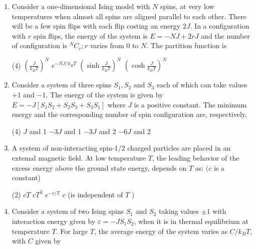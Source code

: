 \begin{enumerate}
\item Consider a one-dimensional Ising model with $N$ spins, at very low temperatures when almost all spins are aligned parallel to each other. There will be a few spin flips with each flip costing an energy $2 J .$ In a configuration with $r$ spin flips, the energy of the system is $E=-N J+2 r J$ and the number of configuration is ${ }^{N} C_{r} ; r$ varies from 0 to $N$. The partition function is
{}

\begin{tasks}(4)
\task[\textbf{A.}] $\left(\frac{J}{k_{B} T}\right)^{N}$
\task[\textbf{B.}]  $e^{-N J / k_{B} T}$
\task[\textbf{C.}] $\left(\sinh \frac{J}{k_{B} T}\right)^{N}$
\task[\textbf{D.}] $\left(\cosh \frac{J}{k_{B} T}\right)^{N}$
\end{tasks}


\item Consider a system of three spins $S_{1}, S_{2}$ and $S_{3}$ each of which can take values $+1$ and $-1 .$ The energy of the system is given by $E=-J\left[S_{1} S_{2}+S_{2} S_{3}+S_{3} S_{1}\right]$ where $J$ is a positive constant. The minimum energy and the corresponding number of spin configuration are, respectively,
{}

\begin{tasks}(4)
\task[\textbf{A.}] $J$ and 1
\task[\textbf{B.}] $-3 J$ and 1
\task[\textbf{C.}] $-3 J$ and 2
\task[\textbf{D.}] $-6 J$ and 2
\end{tasks}
\newcommand*{\downuparrow}[1]{\ensuremath{\overset{\uparrow}{#1}}}
\newcommand*{\downdownarrow}[1]{\ensuremath{\overset{\downarrow}{#1}}}


	\item A system of non-interacting spin-1/2 charged particles are placed in an extemal magnetic field. At low temperature $T$, the leading behavior of the excess energy above the ground state energy, depends on $T$ as: $(c$ is a constant)
	{}

\begin{tasks}(2)
	\task[\textbf{A.}] $c T$
	\task[\textbf{B.}]  $c T^{3}$
	\task[\textbf{C.}] $e^{-c / T}$
	\task[\textbf{D.}] $c$ (is independent of $T$ )
\end{tasks}


	\item Consider a system of two Ising spins $S_{1}$ and $S_{2}$ taking values $\pm 1$ with interaction energy given by $\varepsilon=-J S_{1} S_{2}$, when it is in thermal equilibrium at temperature $T$. For large $T$, the average energy of the system varies as $C / k_{B} T$, with $C$ given by
	{}


\end{enumerate}
